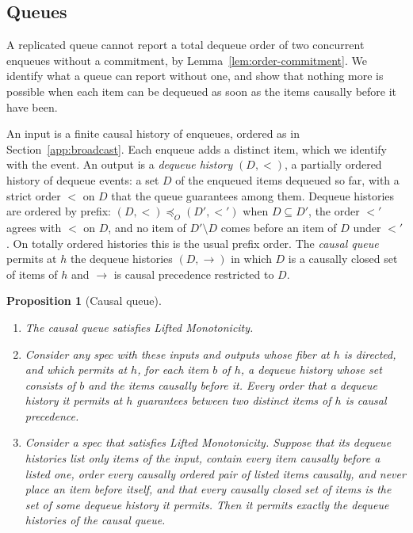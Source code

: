 \documentclass[sigconf]{cidr-2027}
\newtheorem{proposition}{Proposition}
\theoremstyle{remark}
\newcommand{\OutputOrd}{\preceq_O}
\newcommand{\commitment}{commitment\xspace}
\begin{document}
\subsection{Queues}
\label{app:queue}

A replicated queue cannot report a total dequeue order of two concurrent
enqueues without a \commitment, by Lemma~\ref{lem:order-commitment}. We
identify what a queue can report without one, and show that nothing more is
possible when each item can be dequeued as soon as the items causally before
it have been.

An input is a finite causal history of enqueues, ordered as in
Section~\ref{app:broadcast}. Each enqueue adds a distinct item, which we
identify with the event. An output is a \emph{dequeue history} $(D,<)$, a
partially ordered history of dequeue events: a set $D$ of the enqueued items
dequeued so far, with a strict order $<$ on $D$ that the queue guarantees
among them. Dequeue histories are ordered by prefix:
$(D,<)\OutputOrd(D',<')$ when $D\subseteq D'$, the order $<'$ agrees with $<$
on $D$, and no item of $D'\setminus D$ comes before an item of $D$ under
$<'$. On totally ordered histories this is the usual prefix order. The
\emph{causal queue} permits at $h$ the dequeue histories $(D,\to)$ in which $D$
is a causally closed set of items of $h$ and $\to$ is causal precedence
restricted to $D$.

\begin{proposition}[Causal queue]
\label{prop:causal-queue}
\leavevmode
\begin{enumerate}
\item
The causal queue satisfies Lifted Monotonicity.
\item
Consider any spec with these inputs and outputs whose fiber at $h$ is
        directed, and which permits at $h$, for each item $b$ of $h$, a
        dequeue history whose set consists of $b$ and the items causally
        before it. Every order that a dequeue history it permits at $h$
        guarantees between two distinct items of $h$ is causal precedence.
\item
Consider a spec that satisfies Lifted Monotonicity. Suppose that its
        dequeue histories list only items of the input, contain every item
        causally before a listed one, order every causally ordered pair of
        listed items causally, and never place an item before itself, and that
        every causally closed set of items is the set of some dequeue history
        it permits. Then it permits exactly the dequeue histories of the
        causal queue.
\end{enumerate}
\end{proposition}
\end{document}
